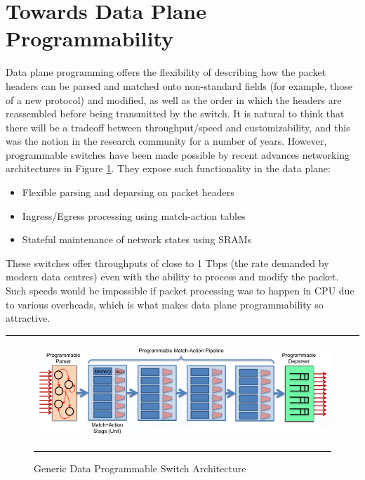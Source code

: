 \section{Towards Data Plane Programmability}
Data plane programming offers the flexibility of describing how the packet headers can be parsed and matched onto non-standard
fields (for example, those of a new protocol) and modified, as well as the order in which the headers are reassembled before being
transmitted by the switch. It is natural to think that there will be a tradeoff between throughput/speed and customizability, and this 
was the notion in the research community for a number of years. However, programmable switches have been made possible by recent 
advances networking architectures in Figure \ref{fig:Match Action}. They expose such functionality in the data plane:
\begin{itemize}
  \item Flexible parsing and deparsing on packet headers
  \item Ingress/Egress processing using match-action tables
  \item Stateful maintenance of network states using SRAMs
\end{itemize}
These switches offer throughputs of close to 1 Tbps (the rate demanded by modern data centres) even with the ability to process and modify the packet. Such speeds would be impossible if packet processing was to happen in CPU due to various overheads, which is what makes data plane programmability so attractive.
\newline
\rule{\textwidth}{0.4pt}
\begin{figure}[htbp]
	\centering
		\includegraphics[width=0.93\columnwidth]{Figures/MatchAction.png}
		\rule{35em}{0.5pt}
	\caption[Match Action Pipeline]{Generic Data Programmable Switch Architecture}
	\label{fig:Match Action}
\end{figure}

